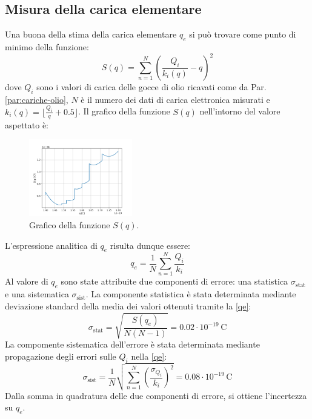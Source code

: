 \documentclass[]{article}
\let\oldsubsection\subsection%
\renewcommand{\subsection}{%
	\renewcommand{\theequation}{\thesubsection.\arabic{equation}}%
	\oldsubsection}%
\begin{document}
    \subsection{Misura della carica elementare}
    Una buona della stima della carica elementare $q_e$ si può trovare come punto di minimo della funzione:
    \begin{equation}
        \label{S-function}
        S(q) = \sum_{n=1}^{N} \left( \frac{Q_i}{k_i \left(q \right)} - q \right)^2
    \end{equation}
    dove $Q_i$ sono i valori di carica delle gocce di olio ricavati come da Par. \ref{par:cariche-olio}, $N$ è il numero dei dati di carica elettronica misurati e $k_i(q)=\lfloor\frac{Q_i}{q} + 0.5 \rfloor$.
    Il grafico della funzione $S(q)$ nell'intorno del valore aspettato è:
    \begin{figure}[H]
        \centering
        \includegraphics[width=0.40\textwidth]{analysis/graph.png}
        \caption{Grafico della funzione $S(q)$.}
        \label{graph}
    \end{figure}    
    L'espressione analitica di $q_e$ risulta dunque essere:
    \begin{equation}
        \label{qe}
        q_e = \frac{1}{N} \sum_{n=1}^{N} \frac{Q_i}{k_i}
    \end{equation}
    Al valore di $q_e$ sono state attribuite due componenti di errore: una statistica $\sigma_{\text{stat}}$ e una sistematica $\sigma_{\text{sist}}$. La componente statistica è stata determinata mediante deviazione standard della media dei valori ottenuti tramite la \ref{qe}:
    \begin{equation}
        \label{sigma-stat}
        \sigma_{\text{stat}} = \sqrt{ \frac{S(q_e)}{N \left(N-1 \right)} } = 0.02 \cdot 10^{-19} \, \text{C}
    \end{equation}
    La compomente sistematica dell'errore è stata determinata mediante propagazione degli errori sulle $Q_i$ nella \ref{qe}:
    \begin{equation}
        \sigma_{\text{sist}} = \frac{1}{N} \sqrt{\sum_{n=1}^{N} \left(\frac{\sigma_{Q_i}}{k_i} \right)^2} = 0.08 \cdot 10^{-19} \, \text{C}
    \end{equation}
    Dalla somma in quadratura delle due componenti di errore, si ottiene l'incertezza su $q_e$.
\end{document}
